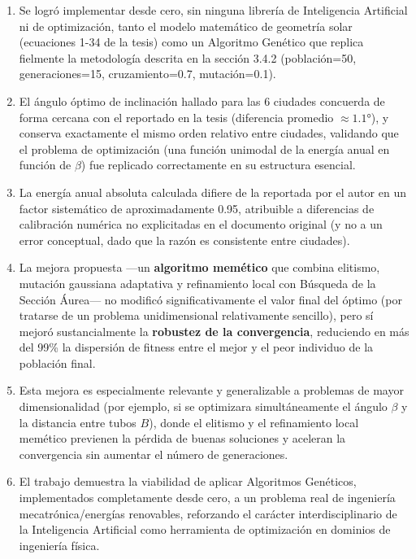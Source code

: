\documentclass[11pt,a4paper]{article}
\begin{document}
\begin{enumerate}[nosep]
  \item Se logró implementar desde cero, sin ninguna librería de
        Inteligencia Artificial ni de optimización, tanto el modelo
        matemático de geometría solar (ecuaciones 1-34 de la tesis) como un
        Algoritmo Genético que replica fielmente la metodología descrita en
        la sección 3.4.2 (población=50, generaciones=15, cruzamiento=0.7,
        mutación=0.1).
  \item El ángulo óptimo de inclinación hallado para las 6 ciudades
        concuerda de forma cercana con el reportado en la tesis (diferencia
        promedio $\approx 1.1°$), y conserva exactamente el mismo orden
        relativo entre ciudades, validando que el problema de optimización
        (una función unimodal de la energía anual en función de $\beta$) fue
        replicado correctamente en su estructura esencial.
  \item La energía anual absoluta calculada difiere de la reportada por el
        autor en un factor sistemático de aproximadamente 0.95, atribuible a
        diferencias de calibración numérica no explicitadas en el documento
        original (y no a un error conceptual, dado que la razón es
        consistente entre ciudades).
  \item La mejora propuesta —un \textbf{algoritmo memético} que combina
        elitismo, mutación gaussiana adaptativa y refinamiento local con
        Búsqueda de la Sección Áurea— no modificó significativamente el
        valor final del óptimo (por tratarse de un problema unidimensional
        relativamente sencillo), pero sí mejoró sustancialmente la
        \textbf{robustez de la convergencia}, reduciendo en más del 99\% la
        dispersión de fitness entre el mejor y el peor individuo de la
        población final.
  \item Esta mejora es especialmente relevante y generalizable a problemas
        de mayor dimensionalidad (por ejemplo, si se optimizara
        simultáneamente el ángulo $\beta$ y la distancia entre tubos $B$),
        donde el elitismo y el refinamiento local memético previenen la
        pérdida de buenas soluciones y aceleran la convergencia sin
        aumentar el número de generaciones.
  \item El trabajo demuestra la viabilidad de aplicar Algoritmos Genéticos,
        implementados completamente desde cero, a un problema real de
        ingeniería mecatrónica/energías renovables, reforzando el carácter
        interdisciplinario de la Inteligencia Artificial como herramienta de
        optimización en dominios de ingeniería física.
\end{enumerate}
\end{document}
